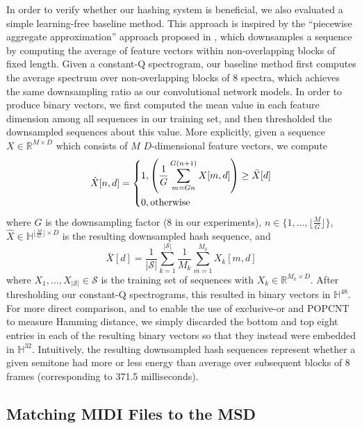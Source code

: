 In order to verify whether our hashing system is beneficial, we also evaluated a simple learning-free baseline method.
This approach is inspired by the ``piecewise aggregate approximation'' approach proposed in \cite{keogh2001dimensionality,yi2000fast}, which downsamples a sequence by computing the average of feature vectors within non-overlapping blocks of fixed length.
Given a constant-Q spectrogram, our baseline method first computes the average spectrum over non-overlapping blocks of 8 spectra, which achieves the same downsampling ratio as our convolutional network models.
In order to produce binary vectors, we first computed the mean value in each feature dimension among all sequences in our training set, and then thresholded the downsampled sequences about this value.
More explicitly, given a sequence $X \in \mathbb{R}^{M \times D}$ which consists of $M$ $D$-dimensional feature vectors, we compute
\begin{equation}
\hat{X}[n, d] = \begin{dcases}
1, \left(\frac{1}{G} \sum_{m = Gn}^{G(n + 1)} X[m, d]\right) \ge \bar{X}[d]\\
0, \mathrm{otherwise}
\end{dcases}
\end{equation}
where $G$ is the downsampling factor ($8$ in our experiments), $n \in \{1, \ldots, \lfloor \frac{M}{G} \rfloor\}$,  $\hat{X} \in \mathbb{H}^{\lfloor \frac{M}{G} \rfloor \times D}$ is the resulting downsampled hash sequence, and
\begin{equation}
\bar{X}[d] = \frac{1}{|\mathcal{S}|} \sum_{k = 1}^{|\mathcal{S}|} \frac{1}{M_k}\sum_{m = 1}^{M_k} X_k[m, d]
\end{equation}
where $X_1, \ldots, X_{|\mathcal{S}|} \in \mathcal{S}$ is the training set of sequences with $X_k \in \mathbb{R}^{M_k \times D}$.
After thresholding our constant-Q spectrograms, this resulted in binary vectors in $\mathbb{H}^{48}$.
For more direct comparison, and to enable the use of exclusive-or and POPCNT to measure Hamming distance, we simply discarded the bottom and top eight entries in each of the resulting binary vectors so that they instead were embedded in $\mathbb{H}^{32}$.
Intuitively, the resulting downsampled hash sequences represent whether a given semitone had more or less energy than average over subsequent blocks of 8 frames (corresponding to 371.5 milliseconds).

\subsection{Matching MIDI Files to the MSD}
\label{sec:matching_process}

